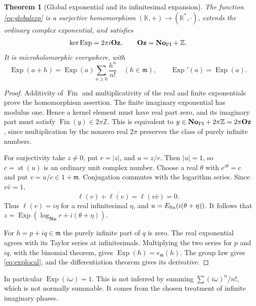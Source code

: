 \documentclass[11pt,letterpaper]{article}
\numberwithin{equation}{section}
\newtheorem{theorem}{Theorem}[section]
\theoremstyle{definition}
\theoremstyle{remark}
\newcommand{\No}{\mathbf{No}}
\newcommand{\Oz}{\mathbf{Oz}}
\newcommand{\K}{\mathbb K}
\newcommand{\Z}{\mathbb Z}
\newcommand{\mm}{\mathfrak m}
\DeclareMathOperator{\st}{st}
\DeclareMathOperator{\Exp}{Exp}
\DeclareMathOperator{\Fin}{Fin}
\begin{document}
\begin{theorem}[Global exponential and its infinitesimal expansion]
The function \eqref{eq:globalexp} is a surjective homomorphism
$(\K,+)\to(\K^*,\cdot)$, extends the ordinary complex exponential, and
satisfies
\begin{equation}\label{eq:expkernel}
 \ker\Exp=2\pi i\Oz,
 \qquad \Oz=\No_{\rm PI}+\Z.
\end{equation}
It is microholomorphic everywhere, with
\begin{equation}\label{eq:explocal}
 \Exp(a+h)=\Exp(a)\sum_{n\ge0}\frac{h^n}{n!}
 \quad(h\in\mm),\qquad \Exp'(a)=\Exp(a).
\end{equation}
\end{theorem}
\begin{proof}
Additivity of $\Fin$ and multiplicativity of the real and finite
exponentials prove the homomorphism assertion. The finite imaginary
exponential has modulus one. Hence a kernel element must have real
part zero, and its imaginary part must satisfy
$\Fin(y)\in2\pi\Z$. This is equivalent to
$y\in\No_{\rm PI}+2\pi\Z=2\pi\Oz$, since multiplication by the
nonzero real $2\pi$ preserves the class of purely infinite numbers.

For surjectivity take $z\ne0$, put $r=|z|$, and $u=z/r$.
Then $|u|=1$, so $c=\st(u)$ is an ordinary unit complex number.
Choose a real $\theta$ with $e^{i\theta}=c$ and put $v=u/c\in1+\mm$.
Conjugation commutes with the logarithm series. Since $v\bar v=1$,
\[
 \ell(v)+\overline{\ell(v)}=\ell(v\bar v)=0.
\]
Thus $\ell(v)=i\eta$ for a real infinitesimal $\eta$, and
$u=E_{\rm fin}(i(\theta+\eta))$. It follows that
$z=\Exp(\log_{\No}r+i(\theta+\eta))$.

For $h=p+iq\in\mm$ the purely infinite part of $q$ is zero.
The real exponential agrees with its Taylor series at infinitesimals.
Multiplying the two series for $p$ and $iq$, with the binomial theorem,
gives $\Exp(h)=e_{\mm}(h)$. The group law gives
\eqref{eq:explocal}, and the differentiation theorem gives its derivative.
\end{proof}

In particular $\Exp(i\omega)=1$. This is not inferred by summing
$\sum(i\omega)^n/n!$, which is not normally summable. It comes from the
chosen treatment of infinite imaginary phases.
\end{document}
